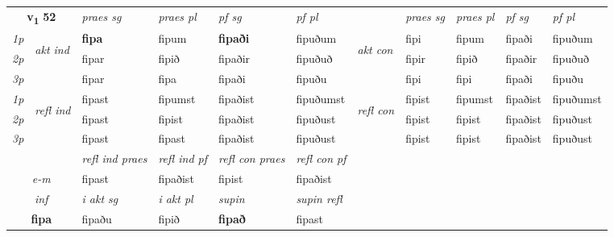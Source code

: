\noindent
\begin{tabular}{lllllllllll} \toprule
\multicolumn{2}{c}{\textbf{v{\textsubscript{1}}} \Large{\textbf{52}}}  &  \textit{praes sg}  & \textit{praes pl}  &\textit{ pf sg} & \textit{pf pl} &  &  \textit{praes sg}  & \textit{praes pl}  & \textit{pf sg} & \textit{pf pl } \\*
	\cmidrule{3-6} \cmidrule{8-11}
 {\textit{1p}} & \multirow{3}{*}{\begin{turn}{90}\textit{akt ind}\end{turn}} & \textbf{fipa} & fipum & \textbf{fipaði} & fipuðum & \multirow{3}{*}{\begin{turn}{90}\textit{akt con}\end{turn}} &fipi & fipum & fipaði & fipuðum\\*
 {\textit{2p}} &  &  fipar  & fipið & fipaðir & fipuðuð & & fipir & fipið & fipaðir & fipuðuð \\*
{\textit{3p}} &  & fipar & fipa & fipaði & fipuðu & & fipi & fipi& fipaði & fipuðu \\*
\cmidrule{3-6} \cmidrule{8-11}
 {\textit{1p}} & \multirow{3}{*}{\begin{turn}{90}\textit{refl ind}\end{turn}}  & fipast & fipumst & fipaðist & fipuðumst & \multirow{3}{*}{\begin{turn}{90}\textit{refl con}\end{turn}}  &fipist & fipumst & fipaðist & fipuðumst \\*
 {\textit{2p}} &  & fipast & fipist & fipaðist & fipuðust & &fipist & fipist & fipaðist & fipuðust \\*
 {\textit{3p}}  & & fipast & fipast & fipaðist & fipuðust & & fipist & fipist& fipaðist & fipuðust \\*
\cmidrule{3-6} \cmidrule{8-11}

 & & \textit{refl ind praes} & \textit{refl ind pf} & \textit{refl con praes} & \textit{refl con pf} \\*
 \multicolumn{2}{c}{ \textit{e-m} }& fipast & fipaðist & fipist & fipaðist \\*

\cmidrule{3-6}
   \multicolumn{2}{c}{\textit{inf}}  & \textit{i akt sg} & \textit{i akt pl}    & \textit{supin} & \textit{supin refl}  \\*
  \multicolumn{2}{c}{\textbf{fipa}} & fipaðu  & fipið    &  \textbf{fipað} & fipast  \\*
\end{tabular}

